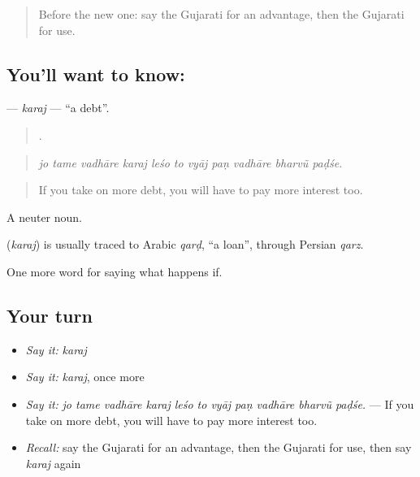 \label{lesson:GU-C371-karaj}



\begin{quote}
Before the new one: say the Gujarati for an advantage, then the Gujarati for use.
\end{quote}

\subsection*{You'll want to know: }
\textbf{} — \emph{karaj} — \textquotedblleft{}a debt\textquotedblright{}.

\begin{quote}
          .
\end{quote}

\begin{quote}
\emph{jo tame vadhāre karaj leśo to vyāj paṇ vadhāre bharvũ paḍśe.}
\end{quote}

\begin{quote}
If you take on more debt, you will have to pay more interest too.
\end{quote}

A neuter noun.

\begin{cousinweb}
\textbf{} (\emph{karaj}) is usually traced to Arabic \emph{qarḍ}, \textquotedblleft{}a loan\textquotedblright{}, through Persian \emph{qarz}.
\end{cousinweb}

\begin{grammarlens}[title={What you've built}]
One more word for saying what happens if.
\end{grammarlens}

\subsection*{Your turn}
\begin{itemize}
\raggedright
  \item \emph{Say it:} \emph{karaj}
  \item \emph{Say it:} \emph{karaj}, once more
  \item \emph{Say it:} \emph{jo tame vadhāre karaj leśo to vyāj paṇ vadhāre bharvũ paḍśe.} — If you take on more debt, you will have to pay more interest too.
  \item \emph{Recall:} say the Gujarati for an advantage, then the Gujarati for use, then say \emph{karaj} again
\end{itemize}

